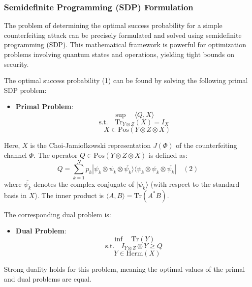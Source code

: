 \documentclass{article} %
\begin{document}

\subsubsection{Semidefinite Programming (SDP) Formulation}
The problem of determining the optimal success probability for a simple counterfeiting attack can be precisely formulated and solved using semidefinite programming (SDP). This mathematical framework is powerful for optimization problems involving quantum states and operations, yielding tight bounds on security.

The optimal success probability (1) can be found by solving the following primal SDP problem:
\begin{itemize}
    \item \textbf{Primal Problem}:
        $$ \sup \quad \langle Q, X \rangle $$
        $$ \text{s.t.} \quad \text{Tr}_{Y\otimes Z}(X) = I_X $$
        $$ \quad X \in \text{Pos}(Y \otimes Z \otimes X) $$
\end{itemize}
Here, $X$ is the Choi-Jamiołkowski representation $J(\Phi)$ of the counterfeiting channel $\Phi$. The operator $Q \in \text{Pos}(Y \otimes Z \otimes X)$ is defined as:
$$ Q = \sum_{k=1}^{N} p_k |\psi_k \otimes \psi_k \otimes \overline{\psi_k}\rangle \langle \psi_k \otimes \psi_k \otimes \overline{\psi_k}| \quad (2) $$
where $\overline{\psi_k}$ denotes the complex conjugate of $|\psi_k\rangle$ (with respect to the standard basis in $X$). The inner product is $\langle A,B\rangle = \text{Tr}(A^*B)$.

The corresponding dual problem is:
\begin{itemize}
    \item \textbf{Dual Problem}:
        $$ \inf \quad \text{Tr}(Y) $$
        $$ \text{s.t.} \quad I_{Y\otimes Z} \otimes Y \ge Q $$
        $$ \quad Y \in \text{Herm}(X) $$
\end{itemize}
Strong duality holds for this problem, meaning the optimal values of the primal and dual problems are equal.
\end{document}
